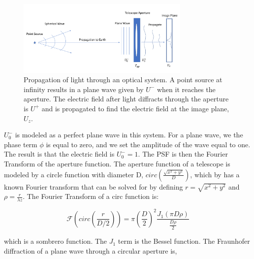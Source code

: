 \begin{figure}
    \centering
    \includegraphics[width=0.75\textwidth]{Chapter Materials/Introduction Materials/Introduction Figures/Propagation.png}
    \caption{Propagation of light through an optical system. A point source at infinity results in a plane wave given by $U^-$ when it reaches the aperture. The electric field after light diffracts through the aperture is $U^+$ and is propagated to find the electric field at the image plane, $U_z$.}
    \label{fig:propagation}
\end{figure}

$U_0^-$ is modeled as a perfect plane wave in this system. For a plane wave, we the phase term $\phi$ is equal to zero, and we set the amplitude of the wave equal to one. The result is that the electric field is $U_0^-=1$. The PSF is then the Fourier Transform of the aperture function. The aperture function of a telescope is modeled by a circle function with diameter D, $circ(\frac{\sqrt{x^2+y^2}}{D})$, which by has a known Fourier transform that can be solved for by defining $r=\sqrt{x^2+y^2}$ and $\rho=\frac{r}{\lambda z}$. The Fourier Transform of a circ function is:



\begin{equation}
    \mathcal{F}\left(circ\left(\frac{r}{D/2}\right)\right)=\pi{\left(\frac{D}{2}\right)}^2 \frac{J_1(\pi D \rho)}{\frac{D\rho}{2}}
\end{equation}

\noindent which is a sombrero function. The $J_1$ term is the Bessel function. The Fraunhofer diffraction of a plane wave through a circular aperture is, 

